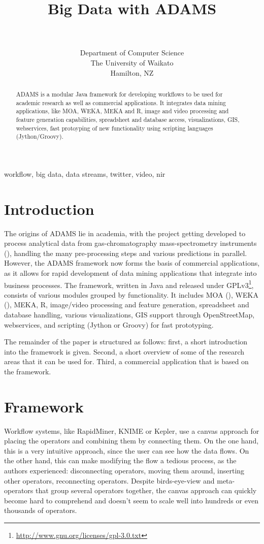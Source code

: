 \documentclass[wcp]{jmlr}
\title[Big Data with ADAMS]{Big Data with ADAMS}
\author{\Name{Peter Reutemann} \Email{fracpete@waikato.ac.nz} \\
  \Name{Geoff Holmes} \Email{geoff@waikato.ac.nz}\\
  \addr Department of Computer Science \\
  The University of Waikato \\
  Hamilton, NZ
 }
\begin{document}
\maketitle

\begin{abstract}
ADAMS is a modular Java framework for developing workflows to be used for
academic research as well as commercial applications. It integrates
data mining applications, like MOA, WEKA, MEKA and R, image and video
processing and feature generation capabilities, spreadsheet and database
access, visualizations, GIS, webservices, fast protoyping of new 
functionality using scripting languages (Jython/Groovy).
\end{abstract}
\begin{keywords}
workflow, big data, data streams, twitter, video, nir
\end{keywords}

\section{Introduction}
The origins of ADAMS lie in academia, with the project getting developed to process analytical data from gas-chromatography mass-spectrometry instruments (\cite{gcms}), handling the many pre-processing steps and various predictions in parallel. However, the ADAMS framework now forms the basis of commercial applications, as it allows for rapid development of data mining applications that integrate into business processes. The framework, written in Java and released under GPLv3\footnote{\url{http://www.gnu.org/licenses/gpl-3.0.txt}{}}, consists of various modules grouped by functionality. It includes MOA (\cite{moa}), WEKA (\cite{weka}), MEKA, R, image/video processing and feature generation, spreadsheet and database handling, various visualizations, GIS support through OpenStreetMap, webservices, and scripting (Jython or Groovy) for fast prototyping.

The remainder of the paper is structured as follows: first, a short introduction into the framework is given. Second, a short overview of some of the research areas that it can be used for. Third, a commercial application that is based on the framework.

\section{Framework}
Workflow systems, like RapidMiner, KNIME or Kepler, use a canvas approach for placing the operators and combining them by connecting them. On the one hand, this is a very intuitive approach, since the user can see how the data flows. On the other hand, this can make modifying the flow a tedious process, as the authors experienced: disconnecting operators, moving them around, inserting other operators, reconnecting operators. Despite birds-eye-view and meta-operators that group several operators together, the canvas approach can quickly become hard to comprehend and doesn't seem to scale well into hundreds or even thousands of operators.
\end{document}

